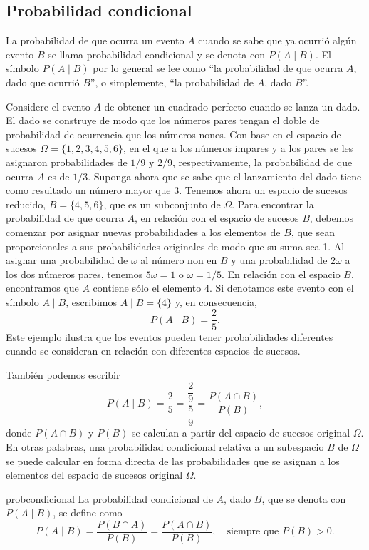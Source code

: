 \subsection*{Probabilidad condicional}

La probabilidad de que ocurra un evento $A$ cuando se sabe que ya ocurrió algún evento $B$ se llama probabilidad condicional y se denota con $P(A \mid B)$. El símbolo $P(A \mid B)$ por lo general se lee como “la probabilidad de que ocurra $A$, dado que ocurrió $B$”, o simplemente, “la probabilidad de $A$, dado $B$”.

\newpage
\label{pagdeeventodados}
Considere el evento $A$ de obtener un cuadrado perfecto cuando se lanza un dado. El dado se construye de modo que los números pares tengan el doble de probabilidad de ocurrencia que los números nones. Con base en el espacio de sucesos $\Omega = \{1, 2, 3, 4, 5, 6\}$, en el que a los números impares y a los pares se les asignaron probabilidades de $1/9$ y $2/9$, respectivamente, la probabilidad de que ocurra $A$ es de $1/3$. Suponga ahora que se sabe que el lanzamiento del dado tiene como resultado un número mayor que 3. Tenemos ahora un espacio de sucesos reducido, $B = \{4, 5, 6\}$, que es un subconjunto de $\Omega$. Para encontrar la probabilidad de que ocurra $A$, en relación con el espacio de sucesos $B$, debemos comenzar por asignar nuevas probabilidades a los elementos de $B$, que sean proporcionales a sus probabilidades originales de modo que su suma sea 1. Al asignar una probabilidad de $\omega$ al número non en $B$ y una probabilidad de $2\omega$ a los dos números pares, tenemos $5\omega = 1$ o $\omega = 1/5$. En relación con el espacio $B$, encontramos que $A$ contiene sólo el elemento 4. Si denotamos este evento con el símbolo $A \mid B$, escribimos $A \mid B = \{4\}$ y, en consecuencia,
$$P(A \mid B) = \frac{2}{5}.$$
Este ejemplo ilustra que los eventos pueden tener probabilidades diferentes cuando se
consideran en relación con diferentes espacios de sucesos.

También podemos escribir
$$P(A \mid B) = \frac{2}{5} = \frac{\dfrac{2}{9}}{\dfrac{5}{9}} = \frac{P(A \cap B)}{P(B)},$$
donde $P(A \cap B)$ y $P(B)$ se calculan a partir del espacio de sucesos original $\Omega$. En otras palabras, una probabilidad condicional relativa a un subespacio $B$ de $\Omega$ se puede calcular en forma directa de las probabilidades que se asignan a los elementos del espacio de sucesos original $\Omega$.

\begin{definicion}{}{probcondicional}
    La probabilidad condicional de $A$, dado $B$, que se denota con $P(A \mid B)$, se define como
    $$P(A \mid B) = \frac{P(B \cap A)}{P(B)} = \frac{P(A \cap B)}{P(B)}, \quad \text{siempre que } P(B) > 0.$$
\end{definicion}

